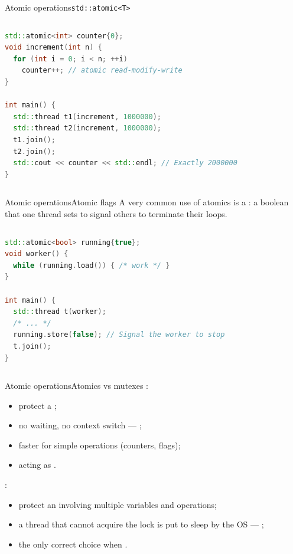 \begin{frame}[fragile]{Atomic operations}{\texttt{std::atomic<T>}}
	\begin{columns}
		\begin{lstlisting}[style=codebeamer, language=C++, caption=Fixing the counter race with \texttt{std::atomic}.]
std::atomic<int> counter{0};
void increment(int n) {
  for (int i = 0; i < n; ++i)
    counter++; // atomic read-modify-write
}

int main() {
  std::thread t1(increment, 1000000);
  std::thread t2(increment, 1000000);
  t1.join();
  t2.join();
  std::cout << counter << std::endl; // Exactly 2000000
}
    \end{lstlisting}
	\end{columns}
\end{frame}
\begin{frame}[fragile]{Atomic operations}{Atomic flags}
	\justifying
	A very common use of atomics is a : a boolean that one thread sets to signal others to terminate their loops.
	\begin{columns}
		\column{.9\textwidth}
		\begin{lstlisting}[style=codebeamer, language=C++, caption=Using an atomic flag to signal thread termination.]
std::atomic<bool> running{true};
void worker() {
  while (running.load()) { /* work */ }
}

int main() {
  std::thread t(worker);
  /* ... */
  running.store(false); // Signal the worker to stop
  t.join();
}
    \end{lstlisting}
	\end{columns}
\end{frame}
\begin{frame}{Atomic operations}{Atomics vs mutexes}
	\justifying
	:
	\begin{itemize}
		\item protect a ;
		\item no waiting, no context switch — ;
		\item faster for simple operations (counters, flags);
		\item acting as .
	\end{itemize}
	\bigskip
	:
	\begin{itemize}
		\item protect an  involving multiple variables and operations;
		\item a thread that cannot acquire the lock is put to sleep by the OS — ;
		\item the only correct choice when .
	\end{itemize}
\end{frame}
